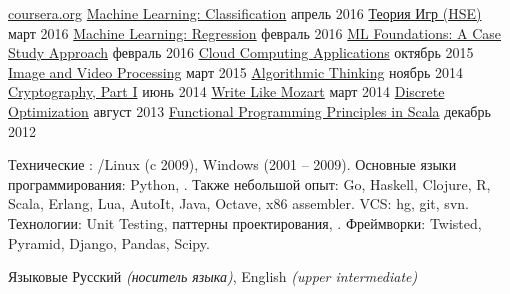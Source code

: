 \documentclass[unicode, 10pt, a4paper, oneside, fleqn]{article}
\begin{document}
\begin{minipage}[t]{0.50\textwidth}
\setlength\abovedisplayskip{0pt}
\courseplatform
    {\href{http://www.coursera.org}{coursera.org}}
    {}
    {
        \course
            {\href{}
                  {Machine Learning: Classification}}
            {апрель 2016}
            {}
        \course
            {\href{}
                  {Теория Игр (HSE)}}
            {март 2016}
            {}
        \course
            {\href{}
                  {Machine Learning: Regression}}
            {февраль 2016}
            {}
        \course
            {\href{}
                  {ML Foundations: A Case Study Approach}}
            {февраль 2016}
            {}
        \course
            {\href{}
                  {Cloud Computing Applications}}
            {октябрь 2015}
            {}
        \course
            {\href{https://drive.google.com/file/d/0B2cptPgckn74MGQ5SUVQRGVDNE0/view}
                  {Image and Video Processing}}
            {март 2015}
            {}
        \course
            {\href{https://drive.google.com/file/d/0B2cptPgckn74ZkIwTWNFYUx6STA/view?usp=sharing}
                  {Algorithmic Thinking}}
            {ноябрь 2014}
            {}
        \course
            {\href{https://drive.google.com/file/d/0B2cptPgckn74OWlrVEZlR3U3azQ/edit?usp=sharing}
                  {Cryptography, Part I}}
            {июнь 2014}
            {}
        \course
            {\href{https://drive.google.com/file/d/0B2cptPgckn74WHJkQkNTdnN4dVU/edit?usp=sharing}
                  {Write Like Mozart}}
            {март 2014}
            {}
        \course
            {\href{https://docs.google.com/file/d/0B2cptPgckn74ZnN0Znhnd3ZUejg/edit?usp=sharing}
                  {Discrete Optimization}}
            {август 2013}
            {}
        \course
            {\href{https://docs.google.com/document/d/1AWaukQ0K4C-ZcuRRqYANJuYDOPxYH7MoVdXYKHPYJ8I/edit}
                  {Functional Programming Principles in Scala}}
            {декабрь 2012}
            {}
    }
\end{minipage}




\inlineheadsection  %
    {Технические}
    {
        : /Linux (c 2009), Windows (2001 -- 2009).
        Основные языки программирования: Python, .
        Также небольшой опыт: Go, Haskell, Clojure, R, Scala, Erlang, Lua,
        AutoIt, Java, Octave, x86 assembler.
        VCS: hg, git, svn.
        Технологии: Unit Testing, паттерны проектирования, .
        Фреймворки: Twisted, Pyramid, Django, Pandas, Scipy.
    }

\inlineheadsection
    {Языковые}
    {
        Русский \emph{(носитель языка)}, English \emph{(upper intermediate)}
    }

\end{document}
